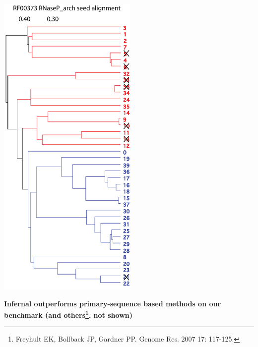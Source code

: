\documentclass[landscape]{slides}
\begin{document}
\begin{slide}
\begin{minipage}{3.5in}
\begin{center}
\includegraphics[height=6in]{figs/u8-RF00373-tree}

\end{center}
\end{minipage}
\end{slide}
\begin{slide}
\begin{center}

\textbf{Infernal outperforms primary-sequence based methods on our
  benchmark (and others\footnote{Freyhult EK, Bollback JP, Gardner
    PP. Genome Res. 2007 17: 117-125.}, not shown)}

\end{center}
\medskip


\vfill 
\end{slide}
\end{document}
